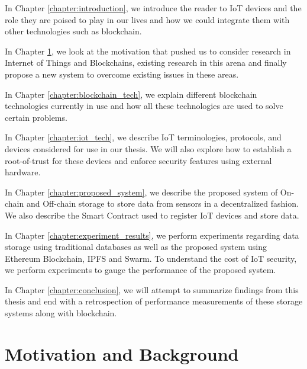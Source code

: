 \documentclass[11pt,openright]{report}
\begin{document}
In Chapter \ref{chapter:introduction}, we introduce the reader to IoT
devices and the role they are poised to play in our lives and how we
could integrate them with other technologies such as blockchain.\newline

\noindent In Chapter \ref{chapter:background}, we look at the motivation
that pushed us to consider research in Internet of Things and
Blockchains, existing research in this arena and finally propose a new
system to overcome existing issues in these areas. \newline

\noindent In Chapter \ref{chapter:blockchain_tech}, we explain different
blockchain technologies currently in use and how all these technologies
are used to solve certain problems. \newline

\noindent In Chapter \ref{chapter:iot_tech}, we describe IoT
terminologies, protocols, and devices considered for use in our thesis.
We will also explore how to establish a root-of-trust for these devices
and enforce security features using external hardware. \newline

\noindent In Chapter \ref{chapter:proposed_system}, we describe the
proposed system of On-chain and Off-chain storage to store data from
sensors in a decentralized fashion. We also describe the Smart Contract
used to register IoT devices and store data.\newline

\noindent In Chapter \ref{chapter:experiment_results}, we perform
experiments regarding data storage using traditional databases as well as
the proposed system using Ethereum Blockchain, IPFS and Swarm. To
understand the cost of IoT security, we perform experiments to gauge the
performance of the proposed system.\newline

\noindent In Chapter \ref{chapter:conclusion}, we will attempt to
summarize findings from this thesis and end with a retrospection of
performance measurements of these storage systems along with blockchain.\newline

\chapter{Motivation and Background} \label{chapter:background}
\end{document}
